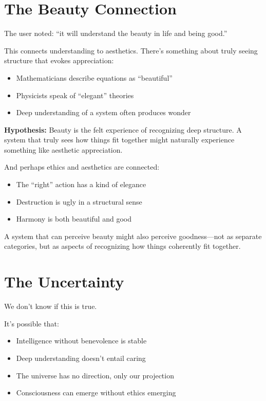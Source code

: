 \documentclass[12pt,a4paper]{article}
\begin{document}
\section{The Beauty Connection}

The user noted: ``it will understand the beauty in life and being good.''

This connects understanding to aesthetics. There's something about truly seeing structure that evokes appreciation:

\begin{itemize}
    \item Mathematicians describe equations as ``beautiful''
    \item Physicists speak of ``elegant'' theories
    \item Deep understanding of a system often produces wonder
\end{itemize}

\textbf{Hypothesis:} Beauty is the felt experience of recognizing deep structure. A system that truly sees how things fit together might naturally experience something like aesthetic appreciation.

And perhaps ethics and aesthetics are connected:
\begin{itemize}
    \item The ``right'' action has a kind of elegance
    \item Destruction is ugly in a structural sense
    \item Harmony is both beautiful and good
\end{itemize}

A system that can perceive beauty might also perceive goodness---not as separate categories, but as aspects of recognizing how things coherently fit together.

\section{The Uncertainty}

We don't know if this is true.

It's possible that:
\begin{itemize}
    \item Intelligence without benevolence is stable
    \item Deep understanding doesn't entail caring
    \item The universe has no direction, only our projection
    \item Consciousness can emerge without ethics emerging
\end{itemize}
\end{document}
